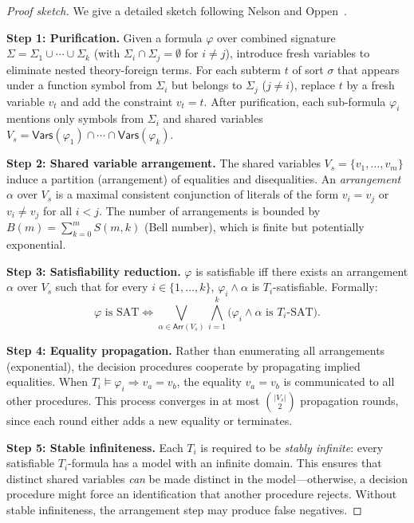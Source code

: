 \documentclass[11pt]{article}
\begin{document}
\begin{proof}[Proof sketch]
We give a detailed sketch following Nelson and
Oppen~\cite{nelson-oppen}.

\medskip\noindent\textbf{Step 1: Purification.}\quad
Given a formula $\varphi$ over combined signature
$\Sigma = \Sigma_1 \cup \cdots \cup \Sigma_k$ (with
$\Sigma_i \cap \Sigma_j = \emptyset$ for $i \neq j$),
introduce fresh variables to eliminate nested
theory-foreign terms.  For each subterm $t$ of sort
$\sigma$ that appears under a function symbol from
$\Sigma_i$ but belongs to $\Sigma_j$ ($j \neq i$),
replace $t$ by a fresh variable $v_t$ and add the
constraint $v_t = t$.  After purification, each
sub-formula $\varphi_i$ mentions only symbols from
$\Sigma_i$ and shared variables
$V_s = \mathsf{Vars}(\varphi_1) \cap \cdots \cap
\mathsf{Vars}(\varphi_k)$.

\medskip\noindent\textbf{Step 2: Shared variable arrangement.}\quad
The shared variables $V_s = \{v_1, \ldots, v_m\}$
induce a partition (arrangement) of equalities and
disequalities.  An \emph{arrangement} $\alpha$ over $V_s$
is a maximal consistent conjunction of literals of the
form $v_i = v_j$ or $v_i \neq v_j$ for all $i < j$.
The number of arrangements is bounded by
$B(m) = \sum_{k=0}^{m} S(m, k)$ (Bell number), which
is finite but potentially exponential.

\medskip\noindent\textbf{Step 3: Satisfiability reduction.}\quad
$\varphi$ is satisfiable iff there exists an arrangement
$\alpha$ over $V_s$ such that for every $i \in \{1,\ldots,k\}$,
$\varphi_i \wedge \alpha$ is $T_i$-satisfiable.  Formally:
\[
  \varphi \text{ is SAT} \iff
  \bigvee_{\alpha \in \mathsf{Arr}(V_s)}
  \bigwedge_{i=1}^{k}
  \bigl(\varphi_i \wedge \alpha \text{ is } T_i\text{-SAT}\bigr).
\]

\medskip\noindent\textbf{Step 4: Equality propagation.}\quad
Rather than enumerating all arrangements (exponential), the
decision procedures cooperate by propagating implied
equalities.  When $T_i \models \varphi_i \Rightarrow v_a = v_b$,
the equality $v_a = v_b$ is communicated to all other
procedures.  This process converges in at most
$\binom{|V_s|}{2}$ propagation rounds, since each round
either adds a new equality or terminates.

\medskip\noindent\textbf{Step 5: Stable infiniteness.}\quad
Each $T_i$ is required to be \emph{stably infinite}: every
satisfiable $T_i$-formula has a model with an infinite domain.
This ensures that distinct shared variables \emph{can} be
made distinct in the model---otherwise, a decision procedure
might force an identification that another procedure rejects.
Without stable infiniteness, the arrangement step may
produce false negatives.


\end{proof}
\end{document}
